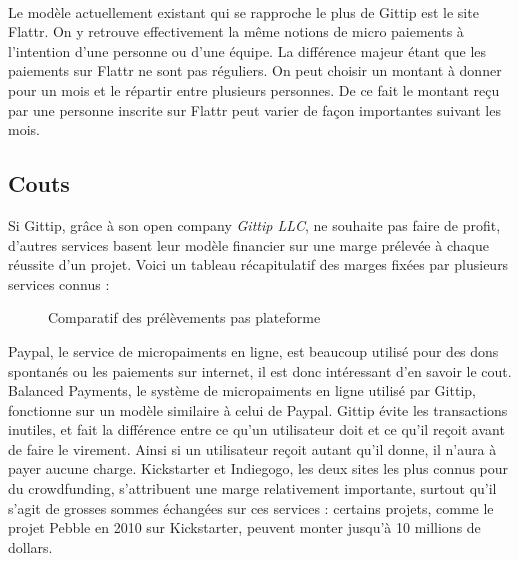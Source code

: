 \paragraph{}
Le modèle actuellement existant qui se rapproche le plus de Gittip est le site
Flattr. On y retrouve effectivement la même notions de micro paiements à
l'intention d'une personne ou d'une équipe. La différence majeur étant que les
paiements sur Flattr ne sont pas réguliers. On peut choisir un montant à donner
pour un mois et le répartir entre plusieurs personnes. De ce fait le montant
reçu par une personne inscrite sur Flattr peut varier de façon importantes
suivant les mois.
\subsection{Couts}

Si Gittip, grâce à son open company \emph{Gittip LLC}, ne souhaite pas faire de
profit, d'autres services basent leur modèle financier sur une marge prélevée à
chaque réussite d'un projet. Voici un tableau récapitulatif des marges fixées
par plusieurs services connus :

\begin{figure}[h!]
    \caption{Comparatif des prélèvements pas plateforme}
\end{figure}

Paypal, le service de micropaiments en ligne,  est beaucoup utilisé pour des
dons spontanés ou les paiements sur internet, il est donc intéressant d'en
savoir le cout. Balanced Payments, le système de micropaiments en ligne utilisé
par Gittip, fonctionne sur un modèle similaire à celui de Paypal. Gittip évite
les transactions inutiles, et fait la différence entre ce qu'un utilisateur
doit et ce qu'il reçoit avant de faire le virement. Ainsi si un utilisateur
reçoit autant qu'il donne, il n'aura à payer aucune charge. Kickstarter et
Indiegogo, les deux sites les plus connus pour du  crowdfunding, s'attribuent
une marge relativement importante, surtout qu'il s'agit de grosses sommes
échangées sur ces services : certains projets, comme le projet Pebble en 2010
sur Kickstarter, peuvent monter jusqu'à 10 millions de dollars.

